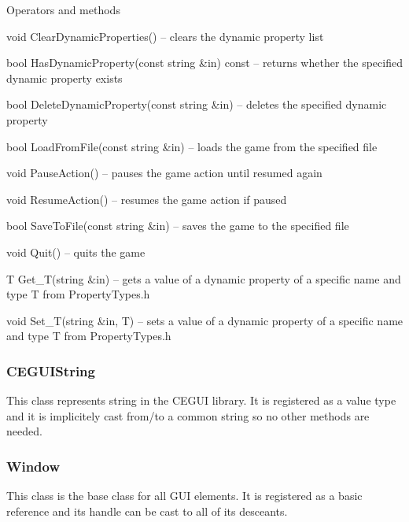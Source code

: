 \begin{titled-itemize}{Operators and methods}
  \item void ClearDynamicProperties() -- clears the dynamic property list
  \item bool HasDynamicProperty(const string \&in) const -- returns whether the specified dynamic property exists
  \item bool DeleteDynamicProperty(const string \&in) -- deletes the specified dynamic property
  \item bool LoadFromFile(const string \&in) -- loads the game from the specified file
  \item void PauseAction() -- pauses the game action until resumed again
  \item void ResumeAction() -- resumes the game action if paused
  \item bool SaveToFile(const string \&in) -- saves the game to the specified file
  \item void Quit() -- quits the game
  \item T Get\_T(string \&in) -- gets a value of a dynamic property of a specific name and type T from PropertyTypes.h
  \item void Set\_T(string \&in, T) -- sets a value of a dynamic property of a specific name and type T from PropertyTypes.h
\end{titled-itemize}

\subsubsection{CEGUIString}

This class represents string in the CEGUI library. It is registered as a value type and it is implicitely cast from/to a common string so no other methods are needed.

\subsubsection{Window}

This class is the base class for all GUI elements. It is registered as a basic reference and its handle can be cast to all of its desceants.

